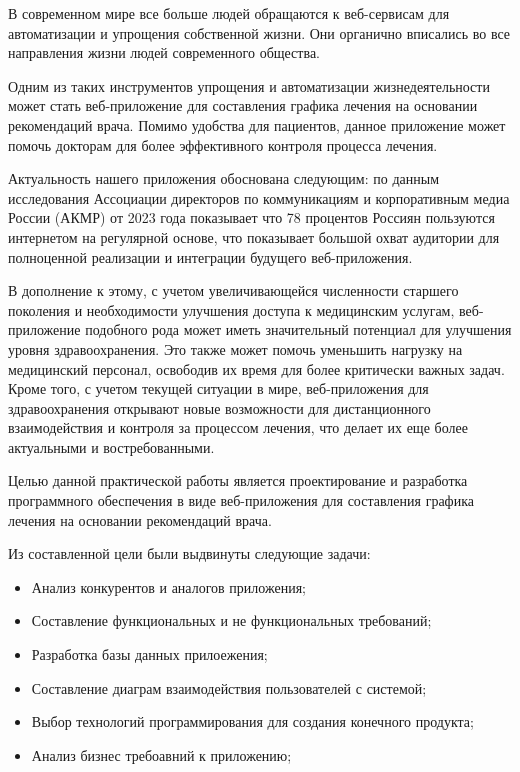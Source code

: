 \documentclass[14pt]{extreport}
\begin{document}
\pagestyle{empty} %

\pagestyle{plain} %


\tableofcontents

\intro 
    В современном мире все больше людей обращаются к веб-сервисам для %
    автоматизации и упрощения собственной жизни. Они органично вписались %
    во все направления жизни людей современного общества.  

    Одним из таких инструментов упрощения и автоматизации жизнедеятельности может %
    стать веб-приложение для составления графика лечения на основании рекомендаций %
    врача. Помимо удобства для пациентов, данное приложение может помочь докторам для %
    более эффективного контроля процесса лечения.

    Актуальность нашего приложения обоснована следующим: по данным исследования Ассоциации директоров по коммуникациям и %
    корпоративным медиа России (АКМР)\cite{internet_users} от 2023 года показывает что 78 процентов %
    Россиян пользуются интернетом на регулярной основе, что показывает большой %
    охват аудитории для полноценной реализации и интеграции будущего веб-приложения.

    В дополнение к этому, с учетом увеличивающейся численности старшего поколения %
    и необходимости улучшения доступа к медицинским услугам, веб-приложение %
    подобного рода может иметь значительный потенциал для улучшения уровня %
    здравоохранения. Это также может помочь уменьшить нагрузку на медицинский %
    персонал, освободив их время для более критически важных задач. Кроме того, %
    с учетом текущей ситуации в мире, веб-приложения для здравоохранения открывают %
    новые возможности для дистанционного взаимодействия и контроля за процессом %
    лечения, что делает их еще более актуальными и востребованными.

    Целью данной практической работы является проектирование и разработка программного %
    обеспечения в виде веб-приложения для составления графика лечения на %
    основании рекомендаций врача.

    Из составленной цели были выдвинуты следующие задачи:
        \begin{itemize}
            \item Анализ конкурентов и аналогов приложения;
            \item Составление функциональных и не функциональных требований;
            \item Разработка базы данных прилоежения;
            \item Составление диаграм взаимодействия пользователей с системой;
            \item Выбор технологий программирования для создания конечного продукта;
            \item Анализ бизнес требоавний к приложению;
        \end{itemize}
\end{document}
